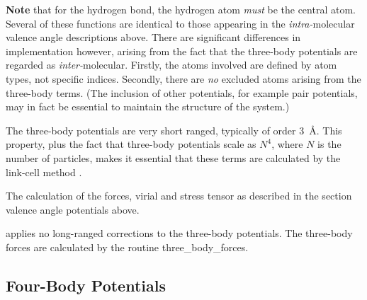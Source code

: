 {\bf Note} that for the hydrogen bond, the
hydrogen atom {\em must} be the central atom.  Several of these
functions are identical to those appearing in the {\em
intra-}molecular valence angle
descriptions above.  There are significant differences in
implementation however, arising from the fact that the
three-body potentials are regarded as
{\em inter-}molecular.  Firstly, the atoms involved are defined by
atom types, not specific indices.  Secondly, there are {\em no}
excluded atoms arising from the
three-body terms.  (The inclusion of
other potentials, for example pair potentials, may in fact be
essential to maintain the structure of the system.)

The three-body potentials are very
short ranged, typically of order $3$~\AA.  This property, plus the
fact that three-body potentials scale
as $N^{4}$, where $N$ is the number of particles, makes it
essential that these terms are calculated by the link-cell method
\cite{eastwood-80a}.

The calculation of the forces, virial and stress
tensor as described in the section valence
angle potentials above.

\D applies no long-ranged corrections to the
three-body potentials.  The
three-body forces are calculated by
the routine {\sc three\_body\_forces}.

\subsection{Four-Body Potentials}
\label{four-body}

